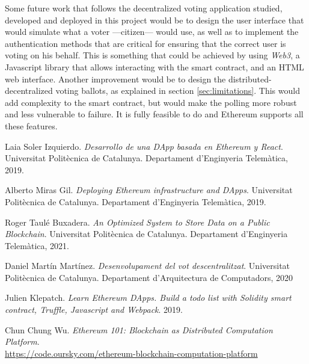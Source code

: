 \documentclass[10pt]{article}
\begin{document}
\begin{multicols}{2}
Some future work that follows the decentralized voting application studied, developed and deployed in this project would be to design the user interface that would simulate what a voter ---citizen--- would use, as well as to implement the authentication methods that are critical for ensuring that the correct user is voting on his behalf. This is something that could be achieved by using \textit{Web3}, a Javascript library that allows interacting with the smart contract, and an HTML web interface. Another improvement would be to design the distributed-decentralized voting ballots, as explained in section \ref{sec:limitations}. This would add complexity to the smart contract, but would make the polling more robust and less vulnerable to failure. It is fully feasible to do and Ethereum supports all these features.

\begin{thebibliography}{100}


Laia Soler Izquierdo. 
\textit{Desarrollo de una DApp basada en Ethereum y React}. 
Universitat Politècnica de Catalunya. Departament d'Enginyeria Telemàtica, 2019.

Alberto Miras Gil. 
\textit{Deploying Ethereum infrastructure and DApps}. 
Universitat Politècnica de Catalunya. Departament d'Enginyeria Telemàtica, 2019.

Roger Taulé Buxadera. 
\textit{An Optimized System to Store Data on a Public Blockchain}. 
Universitat Politècnica de Catalunya. Departament d'Enginyeria Telemàtica, 2021.

Daniel Martín Martínez. 
\textit{Desenvolupament del vot descentralitzat}. 
Universitat Politècnica de Catalunya. Departament d'Arquitectura de Computadors, 2020

Julien Klepatch. 
\textit{Learn Ethereum DApps. Build a todo list with Solidity smart contract, Truffle, Javascript and Webpack}.
2019.


Chun Chung Wu. 
\textit{Ethereum 101: Blockchain as Distributed Computation Platform}.
{\small \\\url{https://code.oursky.com/ethereum-blockchain-computation-platform}}


\end{thebibliography}
\end{multicols}
\end{document}
